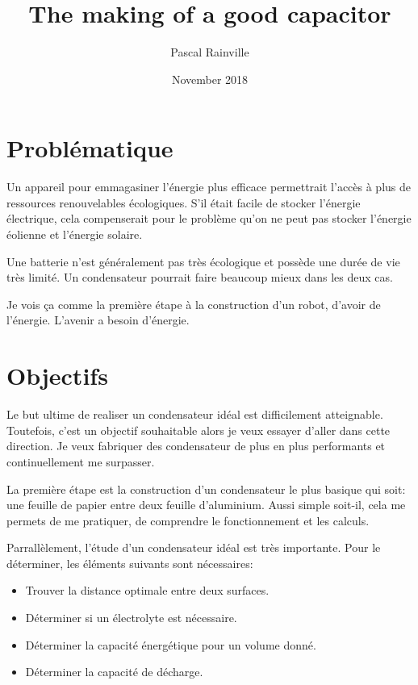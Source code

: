 \documentclass[12 pt, a4paper]{report} %
\title{The making of a good capacitor}
\author{Pascal Rainville}
\date{November 2018}
\begin{document}
\maketitle

\section{Problématique}

Un appareil pour emmagasiner l'énergie plus efficace permettrait l'accès à plus de ressources renouvelables écologiques. S'il était facile de stocker l'énergie électrique, cela compenserait pour le problème qu'on ne peut pas stocker l'énergie éolienne et l'énergie solaire.

Une batterie n'est généralement pas très écologique et possède une durée de vie très limité. Un condensateur pourrait faire beaucoup mieux dans les deux cas.

Je vois ça comme la première étape à la construction d'un robot, d'avoir de l'énergie. L'avenir a besoin d'énergie.

\section{Objectifs}

Le but ultime de realiser un condensateur idéal est difficilement atteignable. Toutefois, c'est un objectif souhaitable alors je veux essayer d'aller dans cette direction. Je veux fabriquer des condensateur de plus en plus performants et continuellement me surpasser.

La première étape est la construction d'un condensateur le plus basique qui soit: une feuille de papier entre deux feuille d'aluminium. Aussi simple soit-il, cela me permets de me pratiquer, de comprendre le fonctionnement et les calculs.

Parrallèlement, l'étude d'un condensateur idéal est très importante. Pour le déterminer, les éléments suivants sont nécessaires:

\begin{itemize}
  \item Trouver la distance optimale entre deux surfaces.
  \item Déterminer si un électrolyte est nécessaire.
  \item Déterminer la capacité énergétique pour un volume donné.
  \item Déterminer la capacité de décharge.
\end{itemize}
\end{document}
